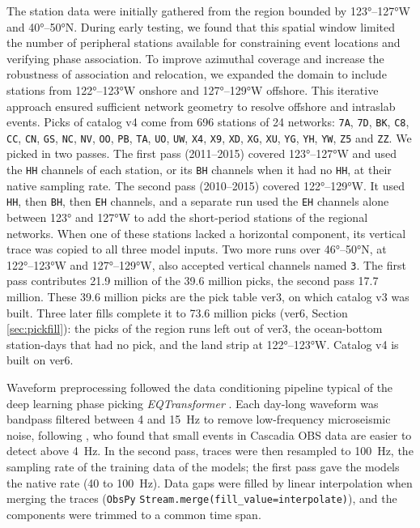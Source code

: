 \documentclass[review]{seismica}
\begin{document}
The station data were initially gathered from the region bounded by
123°--127°W and 40°--50°N. During early testing, we found that this
spatial window limited the number of peripheral stations available for
constraining event locations and verifying phase association. To improve
azimuthal coverage and increase the robustness of association and
relocation, we expanded the domain to include stations from 122°--123°W
onshore and 127°--129°W offshore. This iterative approach ensured
sufficient network geometry to resolve offshore and intraslab events.
Picks of catalog v4 come from 696 stations of 24 networks: \texttt{7A},
\texttt{7D}, \texttt{BK}, \texttt{C8}, \texttt{CC}, \texttt{CN},
\texttt{GS}, \texttt{NC}, \texttt{NV}, \texttt{OO}, \texttt{PB},
\texttt{TA}, \texttt{UO}, \texttt{UW}, \texttt{X4}, \texttt{X9},
\texttt{XD}, \texttt{XG}, \texttt{XU}, \texttt{YG}, \texttt{YH},
\texttt{YW}, \texttt{Z5} and \texttt{ZZ}. We picked in two passes. The
first pass (2011--2015) covered 123°--127°W and used the \texttt{HH}
channels of each station, or its \texttt{BH} channels when it had no
\texttt{HH}, at their native sampling rate. The second pass (2010--2015)
covered 122°--129°W. It used \texttt{HH}, then \texttt{BH}, then
\texttt{EH} channels, and a separate run used the \texttt{EH} channels
alone between 123° and 127°W to add the short-period stations of the
regional networks. When one of these stations lacked a horizontal
component, its vertical trace was copied to all three model inputs. Two
more runs over 46°--50°N, at 122°--123°W and 127°--129°W, also accepted
vertical channels named \texttt{3}. The first pass contributes 21.9
million of the 39.6 million picks, the second pass 17.7 million. These
39.6 million picks are the pick table ver3, on which catalog v3 was
built. Three later fills complete it to 73.6 million picks (ver6,
Section \ref{sec:pickfill}): the picks of the region runs left out of
ver3, the ocean-bottom station-days that had no pick, and the land strip
at 122°--123°W. Catalog v4 is built on ver6.

Waveform preprocessing followed the data conditioning pipeline typical
of the deep learning phase picking \emph{EQTransformer}
\citep{mousavi2020earthquake}. Each day-long waveform was bandpass
filtered between 4 and 15~Hz to remove low-frequency microseismic noise,
following \citet{Morton2023}, who found that small events in Cascadia
OBS data are easier to detect above 4~Hz. In the second pass, traces
were then resampled to 100~Hz, the sampling rate of the training data of
the models; the first pass gave the models the native rate (40 to
100~Hz). Data gaps were filled by linear interpolation when merging the
traces (\texttt{ObsPy}
\texttt{Stream.merge(fill\_value=\textquotesingle{}interpolate\textquotesingle{})}),
and the components were trimmed to a common time span.
\end{document}
